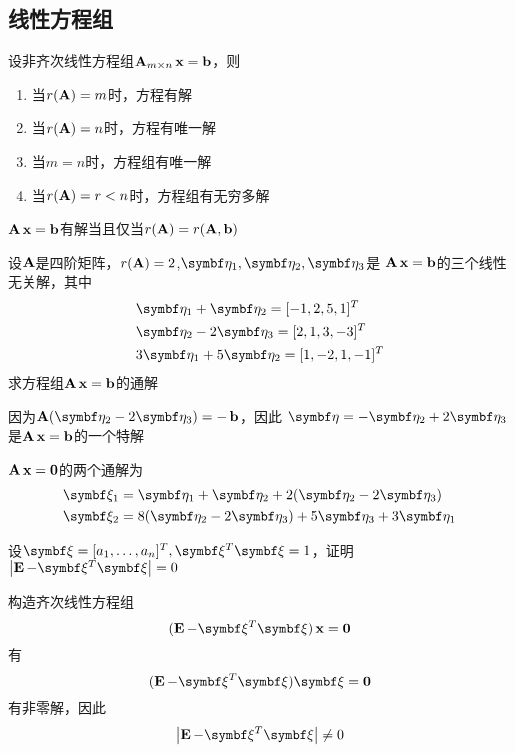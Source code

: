\documentclass{article}
\begin{document}
\subsection{线性方程组}
\label{sec:orgf7cf926}
\begin{examplle}[]
设非齐次线性方程组\(\operatorname{\textbf{A}}_{m\times n}\operatorname{\textbf{x}}=\operatorname{\textbf{b}}\)，则
\begin{enumerate}
\item 当\(r(\operatorname{\textbf{A}})=m\)时，方程有解
\item 当\(r(\operatorname{\textbf{A}})=n\)时，方程有唯一解
\item 当\(m=n\)时，方程组有唯一解
\item 当\(r(\operatorname{\textbf{A}})=r<n\)时，方程组有无穷多解
\end{enumerate}


\(\operatorname{\textbf{A}}\operatorname{\textbf{x}}=\operatorname{\textbf{b}}\)有解当且仅当\(r(\operatorname{\textbf{A}})=r(\operatorname{\textbf{A}},\operatorname{\textbf{b}})\)
\end{examplle}

\begin{examplle}[]
设\(\operatorname{\textbf{A}}\)是四阶矩阵，\(r(\operatorname{\textbf{A}})=2\),\(\boldeta_1,\boldeta_2,\boldeta_3\)是
\(\operatorname{\textbf{A}}\operatorname{\textbf{x}}=\operatorname{\textbf{b}}\)的三个线性无关解，其中
\begin{align*}
&\boldeta_1+\boldeta_2=[-1,2,5,1]^T\\
&\boldeta_2-2\boldeta_3=[2,1,3,-3]^T\\
&3\boldeta_1+5\boldeta_2=[1,-2,1,-1]^T
\end{align*}
求方程组\(\operatorname{\textbf{A}}\operatorname{\textbf{x}}=\operatorname{\textbf{b}}\)的通解

因为\(\bA(\boldeta_2-2\boldeta_3)=-\bb\)，因此
\(\boldeta=-\boldeta_2+2\boldeta_3\)是\(\operatorname{\textbf{A}}\operatorname{\textbf{x}}=\operatorname{\textbf{b}}\)的一个特解

\(\operatorname{\textbf{A}}\operatorname{\textbf{x}}=\mathbf{0}\)的两个通解为
\begin{align*}
&\bxi_1=\boldeta_1+\boldeta_2+2(\boldeta_2-2\boldeta_3)\\
&\bxi_2=8(\boldeta_2-2\boldeta_3)+5\boldeta_3+3\boldeta_1
\end{align*}
\end{examplle}

\begin{examplle}[]
设\(\bxi=[a_1,\dots,a_n]^T,\bxi^T\bxi=1\)，证明\(\abs{\bE-\bxi^T\bxi}=0\)

构造齐次线性方程组
\begin{equation*}
(\bE-\bxi^T\bxi)\bx=\bzero
\end{equation*}
有
\begin{equation*}
(\bE-\bxi^T\bxi)\bxi=\bzero
\end{equation*}
有非零解，因此
\begin{equation*}
\abs{\bE-\bxi^T\bxi}\neq0
\end{equation*}
\end{examplle}
\end{document}
